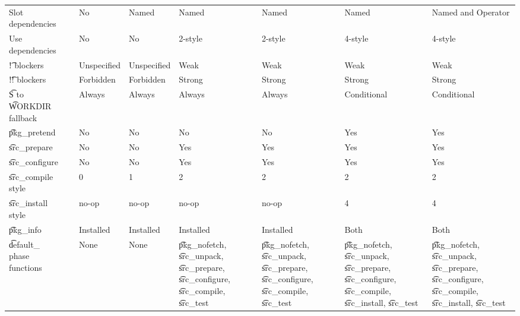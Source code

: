 \begin{landscape}
\begin{longtable}{llP{5em}P{5em}P{6em}P{6em}P{6em}P{6em}}
Slot dependencies &  &
    No & Named & Named & Named & Named & Named and Operator \\

Use dependencies &  &
    No & No & 2-style & 2-style & 4-style & 4-style \\

\t{!} blockers &  &
    Unspecified & Unspecified & Weak & Weak & Weak & Weak \\

\t{!!} blockers &  &
    Forbidden & Forbidden & Strong & Strong & Strong & Strong \\

\t{S} to \t{WORKDIR} fallback &  &
    Always & Always & Always & Always & Conditional & Conditional \\

\t{pkg\_pretend} &  &
    No & No & No & No & Yes & Yes \\

\t{src\_prepare} &  &
    No & No & Yes & Yes & Yes & Yes \\

\t{src\_configure} &  &
    No & No & Yes & Yes & Yes & Yes \\

\t{src\_compile} style &  &
    0 & 1 & 2 & 2 & 2 & 2 \\

\t{src\_install} style &  &
    no-op & no-op & no-op & no-op & 4 & 4 \\

\t{pkg\_info} &  &
    Installed & Installed & Installed & Installed & Both & Both \\

\t{default\_} phase functions &  &
    None & None &
    \t{pkg\_nofetch}, \t{src\_unpack}, \t{src\_prepare}, \t{src\_configure}, \t{src\_compile}, \t{src\_test} &
    \t{pkg\_nofetch}, \t{src\_unpack}, \t{src\_prepare}, \t{src\_configure}, \t{src\_compile}, \t{src\_test} &
    \t{pkg\_nofetch}, \t{src\_unpack}, \t{src\_prepare}, \t{src\_configure},
        \t{src\_compile}, \t{src\_install}, \t{src\_test} &
    \t{pkg\_nofetch}, \t{src\_unpack}, \t{src\_prepare}, \t{src\_configure},
        \t{src\_compile}, \t{src\_install}, \t{src\_test} \\


\end{longtable}
\end{landscape}
